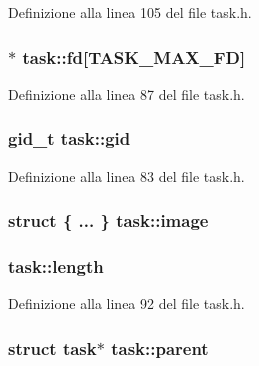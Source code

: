 Definizione alla linea 105 del file task.\+h.

\hypertarget{structtask_afeeb6bafaefe505e6a730dd4e0be5a1a}{
\subsubsection[{fd}]{$\ast$ task\+::fd\mbox{[}{\bf T\+A\+S\+K\+\_\+\+M\+A\+X\+\_\+\+F\+D}\mbox{]}}}\label{structtask_afeeb6bafaefe505e6a730dd4e0be5a1a}


Definizione alla linea 87 del file task.\+h.

\hypertarget{structtask_aaf3b6e15445e766a5c4823b815bca630}{
\subsubsection[{gid}]{\setlength{\rightskip}{0pt plus 5cm}gid\+\_\+t task\+::gid}}\label{structtask_aaf3b6e15445e766a5c4823b815bca630}


Definizione alla linea 83 del file task.\+h.

\hypertarget{structtask_a3eac6c8a544ff49a836c5eed9ec48107}{
\subsubsection[{image}]{\setlength{\rightskip}{0pt plus 5cm}struct \{ ... \}   task\+::image}}\label{structtask_a3eac6c8a544ff49a836c5eed9ec48107}
\hypertarget{structtask_aa90dc3e7e232d6ba3f04700b3197b366}{
\subsubsection[{length}]{ task\+::length}}\label{structtask_aa90dc3e7e232d6ba3f04700b3197b366}


Definizione alla linea 92 del file task.\+h.

\hypertarget{structtask_a34c6613744820a1e8127756fb6a5392c}{
\subsubsection[{parent}]{\setlength{\rightskip}{0pt plus 5cm}struct {\bf task}$\ast$ task\+::parent}}\label{structtask_a34c6613744820a1e8127756fb6a5392c}



